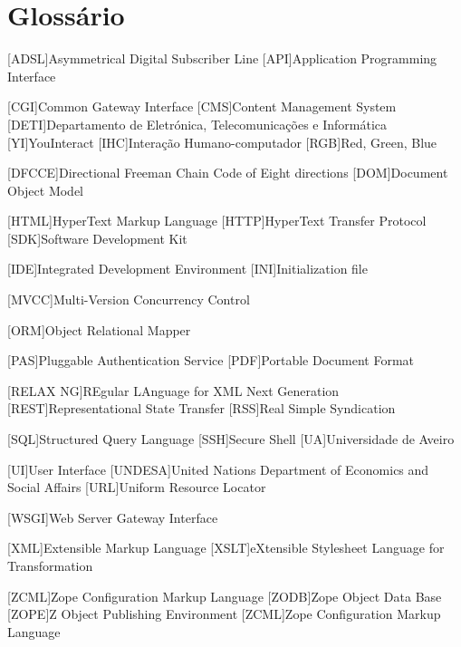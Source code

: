 \chapter*{Glossário}
	\begin{acronym}[RELAX NG]
		
		{Asymmetrical Digital Subscriber Line}
		[API]{Application Programming Interface}
		
		[CGI]{Common Gateway Interface}
		[CMS]{Content Management System}
		{Departamento de Eletrónica, Telecomunicações e Informática  }
		[YI]{YouInteract}		
		[IHC]{Interação Humano-computador}	
        [RGB]{Red, Green, Blue}
        
		[DFCCE]{Directional Freeman Chain Code of Eight directions}
		[DOM]{Document Object Model}
		
		{HyperText Markup Language}
		{HyperText Transfer Protocol}		
		[SDK]{Software Development Kit}
        
        
		[IDE]{Integrated Development Environment}
		[INI]{Initialization file}	
					
		{Multi-Version Concurrency Control}		

		[ORM]{Object Relational Mapper}
		
		[PAS]{Pluggable Authentication Service}
		[PDF]{Portable Document Format}
		
		[RELAX NG]{REgular LAnguage for XML Next Generation}
		{Representational State Transfer}
		[RSS]{Real Simple Syndication}
		
		[SQL]{Structured Query Language}		
		[SSH]{Secure Shell}
		[UA]{Universidade de Aveiro}
        
		[UI]{User Interface}
		[UNDESA]{United Nations Department of Economics and Social Affairs}
		[URL]{Uniform Resource Locator}
		
		{Web Server Gateway Interface}
		
		[XML]{Extensible Markup Language}
		{eXtensible Stylesheet Language for Transformation}
		
		{Zope Configuration Markup Language}
		{Zope Object Data Base}
		{Z Object Publishing Environment}
		{Zope Configuration Markup Language}
	\end{acronym}